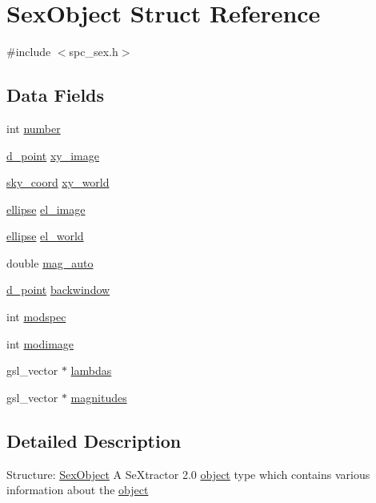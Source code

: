 \hypertarget{structSexObject}{
\section{SexObject Struct Reference}
\label{structSexObject}
}


{\ttfamily \#include $<$spc\_\-sex.h$>$}\subsection*{Data Fields}
\begin{DoxyCompactItemize}
\item 
int \hyperlink{structSexObject_ad41b1dda3b8dba7dd6e53098efaafd23}{number}
\item 
\hyperlink{structd__point}{d\_\-point} \hyperlink{structSexObject_aeb623e63f7277a5f81f85f0d213c6bbd}{xy\_\-image}
\item 
\hyperlink{structsky__coord}{sky\_\-coord} \hyperlink{structSexObject_af314bec47ffaac3fe444f43a5f942d0d}{xy\_\-world}
\item 
\hyperlink{structellipse}{ellipse} \hyperlink{structSexObject_a87b0ff7f5399d04b16efe748d16fb7fc}{el\_\-image}
\item 
\hyperlink{structellipse}{ellipse} \hyperlink{structSexObject_a0f2ad0a554a84e0a03f572a7d2889c79}{el\_\-world}
\item 
double \hyperlink{structSexObject_afbbb8f8bd937e942e0f9aa9560097b13}{mag\_\-auto}
\item 
\hyperlink{structd__point}{d\_\-point} \hyperlink{structSexObject_aabcfc9c81bd2103d1497ccce3955b45e}{backwindow}
\item 
int \hyperlink{structSexObject_a0f462eb5c84b02f2bbdeb4d02dd76f5b}{modspec}
\item 
int \hyperlink{structSexObject_acfe99bcffce1874072c406bf4517cd07}{modimage}
\item 
gsl\_\-vector $\ast$ \hyperlink{structSexObject_a600679e00f71f8e9828818316229da5c}{lambdas}
\item 
gsl\_\-vector $\ast$ \hyperlink{structSexObject_afcb11ccfb82237107b71410de52d9b79}{magnitudes}
\end{DoxyCompactItemize}


\subsection{Detailed Description}
Structure: \hyperlink{structSexObject}{SexObject} A SeXtractor 2.0 \hyperlink{structobject}{object} type which contains various information about the \hyperlink{structobject}{object} 


